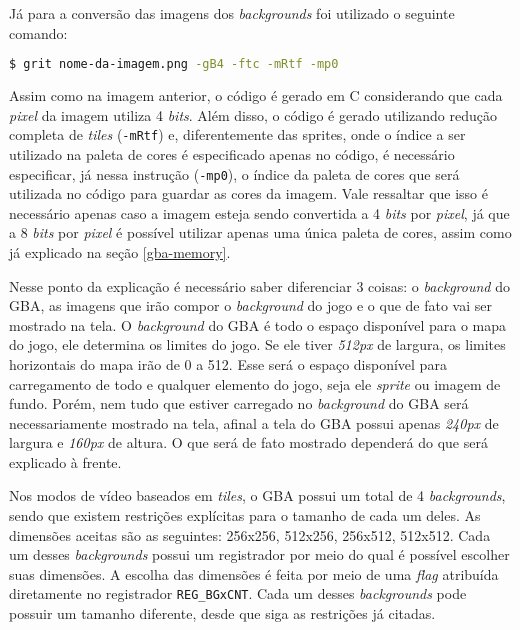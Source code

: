 Já para a conversão das imagens dos \textit{backgrounds} foi utilizado o seguinte comando:

\begin{lstlisting}[language=bash,caption={Comando para conversão dos \textit{backgrounds} em código}]
$ grit nome-da-imagem.png -gB4 -ftc -mRtf -mp0
\end{lstlisting}

Assim como na imagem anterior, o código é gerado em C considerando que cada \textit{pixel} da imagem utiliza 4 \textit{bits}. Além disso, o código é gerado utilizando redução completa de \textit{tiles} (\texttt{-mRtf}) e, diferentemente das sprites, onde o índice a ser utilizado na paleta de cores é especificado apenas no código, é necessário especificar, já nessa instrução (\texttt{-mp0}), o índice da paleta de cores que será utilizada no código para guardar as cores da imagem. Vale ressaltar que isso é necessário apenas caso a imagem esteja sendo convertida a 4 \textit{bits} por \textit{pixel}, já que a 8 \textit{bits} por \textit{pixel} é possível utilizar apenas uma única paleta de cores, assim como já explicado na seção \ref{gba-memory}.

Nesse ponto da explicação é necessário saber diferenciar 3 coisas: o \textit{background} do GBA, as imagens que irão compor o \textit{background} do jogo e o que de fato vai ser mostrado na tela. O \textit{background} do GBA é todo o espaço disponível para o mapa do jogo, ele determina os limites do jogo. Se ele tiver \textit{512px} de largura, os limites horizontais do mapa irão de 0 a 512. Esse será o espaço disponível para carregamento de todo e qualquer elemento do jogo, seja ele \textit{sprite} ou imagem de fundo. Porém, nem tudo que estiver carregado no \textit{background} do GBA será necessariamente mostrado na tela, afinal a tela do GBA possui apenas \textit{240px} de largura e \textit{160px} de altura. O que será de fato mostrado dependerá do que será explicado à frente.

Nos modos de vídeo baseados em \textit{tiles}, o GBA possui um total de 4 \textit{backgrounds}, sendo que existem restrições explícitas para o tamanho de cada um deles. As dimensões aceitas são as seguintes: 256x256, 512x256, 256x512, 512x512. Cada um desses \textit{backgrounds} possui um registrador por meio do qual é possível escolher suas dimensões. A escolha das dimensões é feita por meio de uma \textit{flag} atribuída diretamente no registrador \texttt{REG\_BGxCNT}. Cada um desses \textit{backgrounds} pode possuir um tamanho diferente, desde que siga as restrições já citadas.

